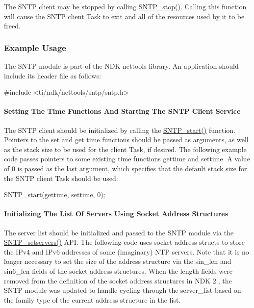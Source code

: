 The S\+N\+T\+P client may be stopped by calling \hyperlink{sntp_8h_aaab818e780a8ec9e87aa39a4d9a31f89}{S\+N\+T\+P\+\_\+stop()}. Calling this function will cause the S\+N\+T\+P client Task to exit and all of the resources used by it to be freed.

\subsubsection*{Example Usage}

The S\+N\+T\+P module is part of the N\+D\+K nettools library. An application should include its header file as follows\+: 
\begin{DoxyCode}
\textcolor{preprocessor}{#include <ti/ndk/nettools/sntp/sntp.h>}
\end{DoxyCode}


\paragraph*{Setting The Time Functions And Starting The S\+N\+T\+P Client Service}

The S\+N\+T\+P client should be initialized by calling the \hyperlink{sntp_8h_a0b8765ce6d90d7d171d740b2eedde328}{S\+N\+T\+P\+\_\+start()} function. Pointers to the set and get time functions should be passed as arguments, as well as the stack size to be used for the client Task, if desired. The following example code passes pointers to some existing time functions \textquotesingle{}gettime\textquotesingle{} and \textquotesingle{}settime\textquotesingle{}. A value of 0 is passed as the last argument, which specifies that the default stack size for the S\+N\+T\+P client Task should be used\+: 
\begin{DoxyCode}
SNTP_start(gettime, settime, 0);
\end{DoxyCode}


\paragraph*{Initializing The List Of Servers Using Socket Address Structures}

The server list should be initialized and passed to the S\+N\+T\+P module via the \hyperlink{sntp_8h_a34409ecc254ee5abf525c69909d3df59}{S\+N\+T\+P\+\_\+setservers()} A\+P\+I. The following code uses socket address structs to store the I\+Pv4 and I\+Pv6 addresses of some (imaginary) N\+T\+P servers. Note that it is no longer necessary to set the size of the address structure via the sin\+\_\+len and sin6\+\_\+len fields of the socket address structures. When the length fields were removed from the definition of the socket address structures in N\+D\+K 2., the S\+N\+T\+P module was updated to handle cycling through the server\+\_\+list based on the family type of the current address structure in the list.

